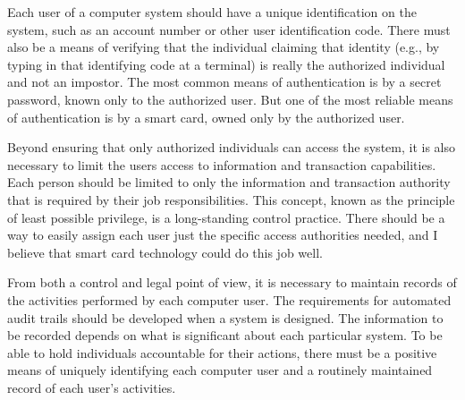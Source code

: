 \begin{htmllist}


    Each user of a computer system should have a unique identification on
    the system, such as an account number or other user identification
    code. There must also be a means of verifying that the individual
    claiming that identity (e.g., by typing in that identifying code at a
    terminal) is really the authorized individual and not an impostor. The
    most common means of authentication is by a secret password, known only
    to the authorized user. But one of the most reliable means of
    authentication is by a smart card, owned only by the authorized user.


    
    Beyond ensuring that only authorized individuals can access the system,
    it is also necessary to limit the users access to information and
    transaction capabilities. Each person should be limited to only the
    information and transaction authority that is required by their job
    responsibilities. This concept, known as the principle of least
    possible privilege, is a long-standing control practice. There should
    be a way to easily assign each user just the specific access
    authorities needed, and I believe that smart card technology could do
    this job well.


    
    From both a control and legal point of view, it is necessary to
    maintain records of the activities performed by each computer user. The
    requirements for automated audit trails should be developed when a
    system is designed. The information to be recorded depends on what is
    significant about each particular system. To be able to hold
    individuals accountable for their actions, there must be a positive
    means of uniquely identifying each computer user and a routinely
    maintained record of each user's activities.



\end{htmllist}
